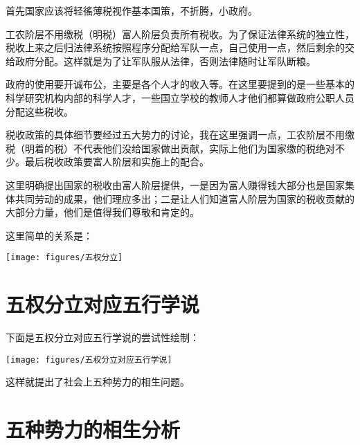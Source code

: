 \documentclass[11pt,oneside]{article}
\begin{document}
\begin{common-format}
首先国家应该将轻徭薄税视作基本国策，不折腾，小政府。

工农阶层不用缴税（明税）富人阶层负责所有税收。为了保证法律系统的独立性，税收上来之后归法律系统按照程序分配给军队一点，自己使用一点，然后剩余的交给政府分配。这样就是为了让军队服从法律，否则法律随时让军队断粮。

政府的使用要开诚布公，主要是各个人才的收入等。在这里要提到的是一些基本的科学研究机构内部的科学人才，一些国立学校的教师人才他们都算做政府公职人员分配这些税收。

税收政策的具体细节要经过五大势力的讨论，我在这里强调一点，工农阶层不用缴税（明着的税）不代表他们没给国家做出贡献，实际上他们为国家缴的税绝对不少。最后税收政策要富人阶层和实施上的配合。

这里明确提出国家的税收由富人阶层提供，一是因为富人赚得钱大部分也是国家集体共同劳动的成果，他们理应多出；二是让人们知道富人阶层为国家的税收贡献的大部分力量，他们是值得我们尊敬和肯定的。

这里简单的关系是：

\texttt{[image: figures/五权分立]} 

\section{五权分立对应五行学说}
下面是五权分立对应五行学说的尝试性绘制：

\texttt{[image: figures/五权分立对应五行学说]} 

这样就提出了社会上五种势力的相生问题。

\section{五种势力的相生分析}



\end{common-format}
\end{document}
